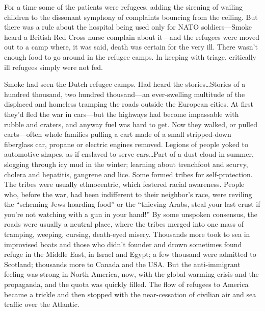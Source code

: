 For a time some of the patients were refugees, adding the sirening of wailing children to the dissonant symphony of complaints bouncing from the ceiling. But there was a rule about the hospital being used only for NATO soldiers---Smoke heard a British Red Cross nurse complain about it---and the refugees were moved out to a camp where, it was said, death was certain for the very ill. There wasn't enough food to go around in the refugee camps. In keeping with triage, critically ill refugees simply were not fed.

Smoke had seen the Dutch refugee camps. Had heard the stories\ldots Stories of a hundred thousand, two hundred thousand---an ever-swelling multitude of the displaced and homeless tramping the roads outside the European cities. At first they'd fled the war in cars---but the highways had become impassable with rubble and craters, and anyway fuel was hard to get. Now they walked, or pulled carts---often whole families pulling a cart made of a small stripped-down fiberglass car, propane or electric engines removed. Legions of people yoked to automotive shapes, as if enslaved to serve cars\ldots Part of a dust cloud in summer, slogging through icy mud in the winter; learning about trenchfoot and scurvy, cholera and hepatitis, gangrene and lice. Some formed tribes for self-protection. The tribes were usually ethnocentric, which festered racial awareness. People who, before the war, had been indifferent to their neighbor's race, were reviling the ``scheming Jews hoarding food'' or the ``thieving Arabs, steal your last crust if you're not watching with a gun in your hand!'' By some unspoken consensus, the roads were usually a neutral place, where the tribes merged into one mass of tramping, weeping, cursing, death-eyed misery. Thousands more took to sea in improvised boats and those who didn't founder and drown sometimes found refuge in the Middle East, in Israel and Egypt; a few thousand were admitted to Scotland; thousands more to Canada and the USA. But the anti-immigrant feeling was strong in North America, now, with the global warming crisis and the propaganda, and the quota was quickly filled. The flow of refugees to America became a trickle and then stopped with the near-cessation of civilian air and sea traffic over the Atlantic.

